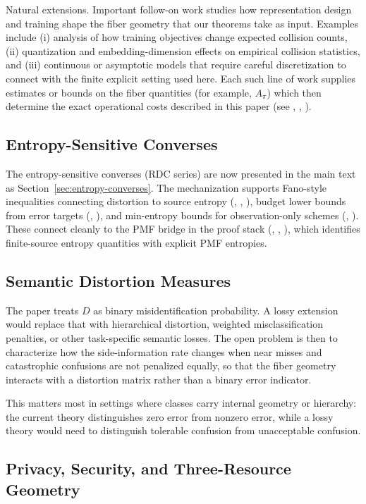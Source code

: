 Natural extensions. Important follow-on work studies how representation design and training shape the fiber geometry that our theorems take as input. Examples include (i) analysis of how training objectives change expected collision counts, (ii) quantization and embedding-dimension effects on empirical collision statistics, and (iii) continuous or asymptotic models that require careful discretization to connect with the finite explicit setting used here. Each such line of work supplies estimates or bounds on the fiber quantities (for example, $A_\pi$) which then determine the exact operational costs described in this paper (see , , ).

\subsection{Entropy-Sensitive Converses}

The entropy-sensitive converses (RDC series) are now presented in the main text as Section~\ref{sec:entropy-converses}. The mechanization supports Fano-style inequalities connecting distortion to source entropy (, , ), budget lower bounds from error targets (, ), and min-entropy bounds for observation-only schemes (, ). These connect cleanly to the PMF bridge in the proof stack (, , ), which identifies finite-source entropy quantities with explicit PMF entropies.

\subsection{Semantic Distortion Measures}

The paper treats $D$ as binary misidentification probability. A lossy extension would replace that with hierarchical distortion, weighted misclassification penalties, or other task-specific semantic losses. The open problem is then to characterize how the side-information rate changes when near misses and catastrophic confusions are not penalized equally, so that the fiber geometry interacts with a distortion matrix rather than a binary error indicator.

This matters most in settings where classes carry internal geometry or hierarchy: the current theory distinguishes zero error from nonzero error, while a lossy theory would need to distinguish tolerable confusion from unacceptable confusion.

\subsection{Privacy, Security, and Three-Resource Geometry}

